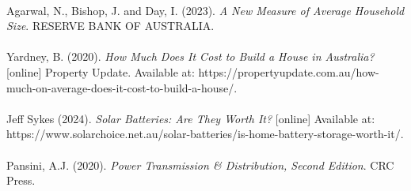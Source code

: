 \documentclass{article}
\begin{document}
\\
Agarwal, N., Bishop, J. and Day, I. (2023). \textit{A New Measure of Average Household Size}. RESERVE BANK OF AUSTRALIA.\\
\\
Yardney, B. (2020). \textit{How Much Does It Cost to Build a House in Australia?} [online] Property Update. Available at: https://propertyupdate.com.au/how-much-on-average-does-it-cost-to-build-a-house/.\\
\\
Jeff Sykes (2024). \textit{Solar Batteries: Are They Worth It?} [online] Available at: \\https://www.solarchoice.net.au/solar-batteries/is-home-battery-storage-worth-it/.\\
\\
Pansini, A.J. (2020). \textit{Power Transmission \& Distribution, Second Edition}. CRC Press.
\end{document}
